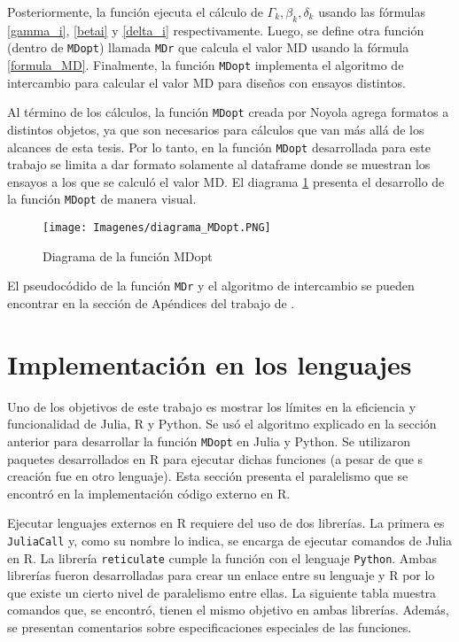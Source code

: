 Posteriormente, la función ejecuta el cálculo de $\Gamma_k, \beta_k, \delta_k$ usando las fórmulas \ref{gamma_i}, \ref{betai} y \ref{delta_i} respectivamente. Luego, se define otra función (dentro de \texttt{MDopt}) llamada \texttt{MDr} que calcula el valor MD usando la fórmula \ref{formula_MD}. Finalmente, la función \texttt{MDopt} implementa el algoritmo de intercambio para calcular el valor MD para diseños con ensayos distintos. 

Al término de los cálculos, la función \texttt{MDopt} creada por Noyola agrega formatos a distintos objetos, ya que son necesarios para cálculos que van más allá de los alcances de esta tesis. Por lo tanto, 
en la función \texttt{MDopt} desarrollada para este trabajo se limita a dar formato solamente  al dataframe donde se muestran los ensayos a los que se calculó el valor MD. El diagrama \ref{diagrama_mdopt} presenta el desarrollo de la función \texttt{MDopt} de manera visual. 

\begin{figure}[h]
	\begin{center} 
		\texttt{[image: Imagenes/diagrama\_MDopt.PNG]}
		\caption{Diagrama de la función MDopt}
		\label{diagrama_mdopt}
	\end{center}
\end{figure} 

El pseudocódido de la función \texttt{MDr} y el algoritmo de intercambio se pueden encontrar en la sección de Apéndices del trabajo de \cite{tesis_paty}.  

\section{Implementación en los lenguajes}

Uno de los objetivos de este trabajo es mostrar los límites en la eficiencia y funcionalidad de \textsf{Julia, R} y \textsf{Python}. Se usó el algoritmo explicado en la sección anterior para desarrollar la función \texttt{MDopt} en \textsf{Julia} y \textsf{Python}. Se utilizaron paquetes desarrollados en \textsf{R} para ejecutar dichas funciones (a pesar de que s creación fue en otro lenguaje). Esta sección presenta el paralelismo que se encontró en la implementación código externo en \textsf{R}. 

Ejecutar lenguajes externos en \textsf{R} requiere del uso de dos librerías. La primera es \texttt{JuliaCall} y, como su nombre lo indica, se encarga de ejecutar comandos de \textsf{Julia} en \textsf{R}. La librería \texttt{reticulate} cumple la función con el lenguaje \texttt{Python}. Ambas librerías fueron desarrolladas para crear un enlace entre su lenguaje y \textsf{R} por lo que existe un cierto nivel de paralelismo entre ellas. La siguiente tabla muestra comandos que, se encontró, tienen el mismo objetivo en ambas librerías. Además, se presentan comentarios sobre especificaciones especiales de las funciones. 


